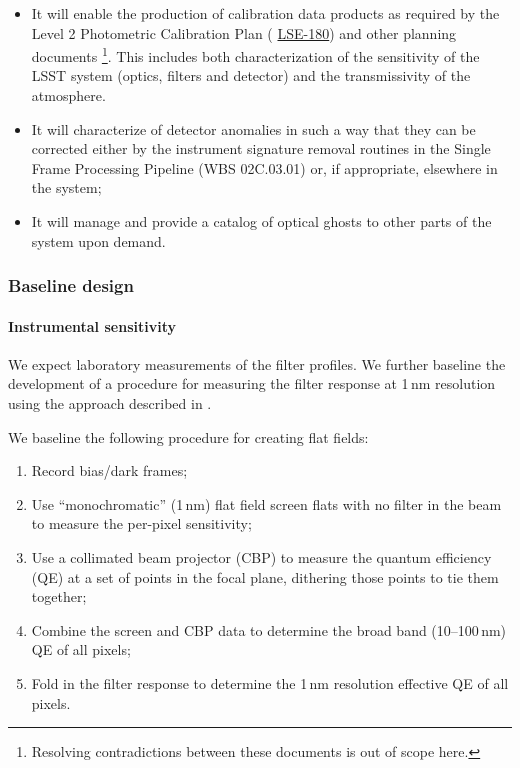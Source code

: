 \documentclass[12pt]{article}
\newcommand{\ds}[2]{{\color{blue} \href{https://docushare.lsstcorp.org/docushare/dsweb/Get/#1}{#2}}\xspace}
\newcommand{\NewPCP}{\ds{LSE-180}{LSE-180}}
\newcommand{\wbsSFM}{WBS 02C.03.01}
\begin{document}
\begin{itemize}
  \item{It will enable the production of calibration data products as required by the Level 2 Photometric Calibration Plan (\NewPCP{}) and other planning documents \cite{Lupton15}\footnote{Resolving contradictions between these documents is out of scope here.}. This includes both characterization of the sensitivity of the LSST system (optics, filters and detector) and the transmissivity of the atmosphere.}
  \item{It will characterize of detector anomalies in such a way that they can be corrected either by the instrument signature removal routines in the Single Frame Processing Pipeline (\wbsSFM) or, if appropriate, elsewhere in the system;}
  \item{It will manage and provide a catalog of optical ghosts to other parts of the system upon demand.}
\end{itemize}

\subsubsection{Baseline design}

\paragraph{Instrumental sensitivity}

We expect laboratory measurements of the filter profiles. We further baseline the development of a procedure for measuring the filter response at 1\,nm resolution using the approach described in \cite{Lupton15}.

We baseline the following procedure for creating flat fields:

\begin{enumerate}
  \item{Record bias/dark frames;}
  \item{Use ``monochromatic'' (1\,nm) flat field screen flats with no filter in the beam to measure the per-pixel sensitivity;}
  \item{Use a collimated beam projector (CBP) to measure the quantum efficiency (QE) at a set of points in the focal plane, dithering those points to tie them together;}
  \item{Combine the screen and CBP data to determine the broad band (10--100\,nm) QE of all pixels;}
  \item{Fold in the filter response to determine the 1\,nm resolution effective QE of all pixels.}
\end{enumerate}
\end{document}
